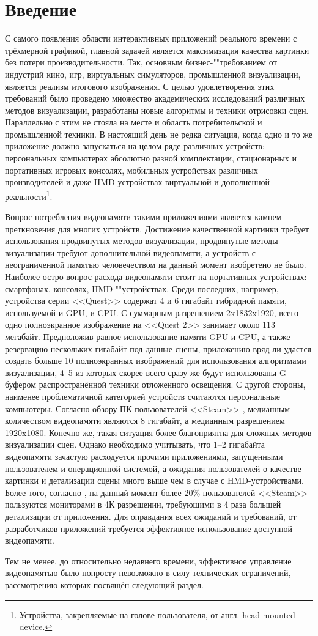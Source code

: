 \section{Введение}
С самого появления области интерактивных приложений реального времени с трёхмерной графикой, главной задачей является максимизация качества картинки без потери производительности.
Так, основным бизнес-""требованием от индустрий кино, игр, виртуальных симуляторов, промышленной визуализации, является реализм итогового изображения.
С целью удовлетворения этих требований было проведено множество академических исследований различных методов визуализации, разработаны новые алгоритмы и техники отрисовки сцен.
Параллельно с этим не стояла на месте и область потребительской и промышленной техники.
В настоящий день не редка ситуация, когда одно и то же приложение должно запускаться на целом ряде различных устройств: персональных компьютерах абсолютно разной комплектации, стационарных и портативных игровых консолях, мобильных устройствах различных производителей и даже HMD-устройствах виртуальной и дополненной реальности\footnote{Устройства, закрепляемые на голове пользователя, от англ. head mounted device.}.

Вопрос потребления видеопамяти такими приложениями является камнем преткновения для многих устройств.
Достижение качественной картинки требует использования продвинутых методов визуализации, продвинутые методы визуализации требуют дополнительной видеопамяти, а устройств с неограниченной памятью человечеством на данный момент изобретено не было.
Наиболее остро вопрос расхода видеопамяти стоит на портативных устройствах: смартфонах, консолях, HMD-""устройствах.
Среди последних, например, устройства серии <<Quest>> содержат 4 и 6 гигабайт гибридной памяти, используемой и GPU, и CPU.
С суммарным разрешением 2x1832x1920, всего одно полноэкранное изображение на <<Quest 2>> занимает около 113 мегабайт.
Предположив равное использование памяти GPU и CPU, а также резервацию нескольких гигабайт под данные сцены, приложению вряд ли удастся создать больше 10 полноэкранных изображений для использования алгоритмами визуализации, 4--5 из которых скорее всего сразу же будут использованы G-буфером распространённой техники отложенного освещения.
С другой стороны, наименее проблематичной категорией устройств считаются персональные компьютеры. Согласно обзору ПК пользователей <<Steam>> \cite{steamSurvey2023may}, медианным количеством видеопамяти являются 8 гигабайт, а медианным разрешением 1920x1080. Конечно же, такая ситуация более благоприятна для сложных методов визуализации сцен. Однако необходимо учитывать, что 1--2 гигабайта видеопамяти зачастую расходуется прочими приложениями, запущенными пользователем и операционной системой, а ожидания пользователей о качестве картинки и детализации сцены много выше чем в случае с HMD-устройствами. Более того, согласно \cite{steamSurvey2023may}, на данный момент более 20\% пользователей <<Steam>> пользуются мониторами в 4К разрешении, требующими в 4 раза большей детализации от приложения. Для оправдания всех ожиданий и требований, от разработчиков приложений требуется эффективное использование доступной видеопамяти.

Тем не менее, до относительно недавнего времени, эффективное управление видеопамятью было попросту невозможно в силу технических ограничений, рассмотрению которых посвящён следующий раздел.

